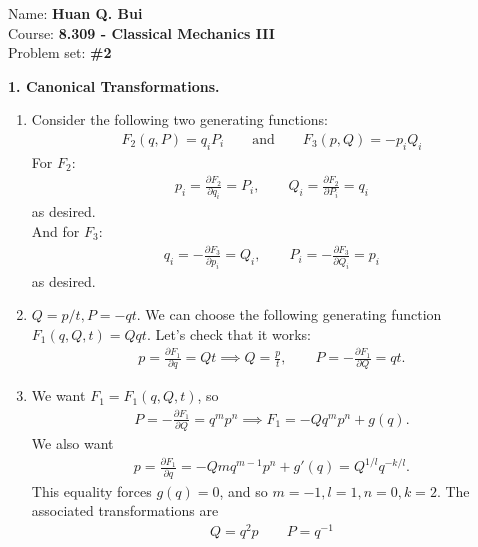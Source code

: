 \documentclass{article}
\theoremstyle{definition}
\newcommand{\p}{\partial}
\newcommand{\f}[2]{\frac{#1}{#2}}
\begin{document}
	
\begin{framed}
	\noindent Name: \textbf{Huan Q. Bui}\\
	Course: \textbf{8.309 - Classical Mechanics III}\\
	Problem set: \textbf{\#2}
\end{framed}


\noindent \textbf{1. Canonical Transformations.}


\begin{enumerate}[label=(\alph*)]
	\item Consider the following two generating functions:
	\begin{align*}
	\boxed{F_2(q,P) = q_iP_i \quad\quad\text{and}\quad\quad F_3(p,Q) = -p_iQ_i}
	\end{align*}
	For $F_2$:
	\begin{align*}
	p_i = \f{\p F_2}{\p q_i} = P_i, \quad\quad Q_i = \f{\p F_2}{\p P_i} = q_i
	\end{align*}
	as desired. \\
	
	And for $F_3$:
	\begin{align*}
	q_i = -\f{\p F_3}{\p p_i} = Q_i, \quad\quad P_i = -\f{\p F_3}{\p Q_i} = p_i
	\end{align*}
	as desired. 
	
	
	\item $Q = p/t, P = -qt$. We can choose the following generating function $\boxed{F_1(q,Q,t) = Qqt}$. Let's check that it works:
	\begin{align*}
	p = \f{\p F_1}{\p q} = Qt \implies Q = \f{p}{t},\quad\quad P = -\f{\p F_1}{\p Q} = qt.
	\end{align*}
	
	
	\item We want $F_1 = F_1(q,Q,t)$, so 
	\begin{align*}
	P = -\f{\p F_1}{\p Q} = q^m p^n \implies F_1 = -Qq^m p^n + g(q).
	\end{align*}
	We also want
	\begin{align*}
	p = \f{\p F_1}{\p q} = -Q m q^{m-1} p^n + g'(q) = Q^{1/l}q^{-k/l}.
	\end{align*}
	This equality forces $g(q) = 0$, and so $\boxed{m=-1,l=1,n=0,k=2}$. The associated transformations are
	\begin{align*}
	{Q = q^2p \quad\quad P = q^{-1}}
	\end{align*}
	

\end{enumerate}
\end{document}
